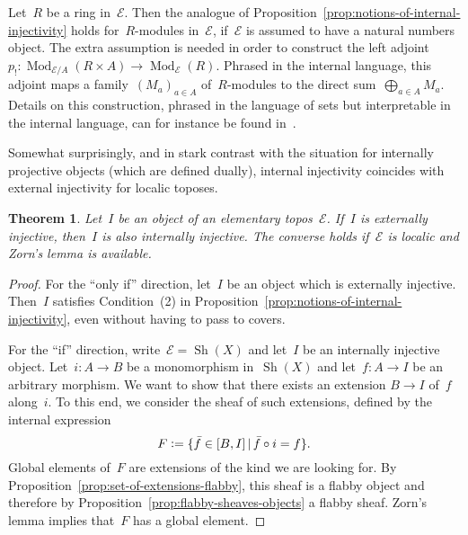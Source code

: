 \documentclass[oneside]{amsart}
\theoremstyle{definition}
\theoremstyle{plain}
\newtheorem{thm}[defn]{Theorem}
\theoremstyle{remark}
\newcommand{\E}{\mathcal{E}}
\newcommand{\defeq}{\vcentcolon=}
\DeclareMathOperator{\Mod}{Mod}
\DeclareMathOperator{\Sh}{Sh}
\renewcommand{\_}{\mathpunct{.}\,}
\begin{document}
Let~$R$ be a ring in~$\E$. Then the analogue of
Proposition~\ref{prop:notions-of-internal-injectivity} holds for~$R$-modules
in~$\E$, if~$\E$ is assumed to have a natural numbers object. The extra
assumption is needed in order to construct the left adjoint~$p_! :
\Mod_{\E/A}(R \times A) \to \Mod_\E(R)$. Phrased in the internal language, this
adjoint maps a family~$(M_a)_{a \in A}$ of~$R$-modules to the direct
sum~$\bigoplus_{a \in A} M_a$. Details on this construction, phrased in the
language of sets but interpretable in the internal language, can for instance
be found in~\cite[page~54]{mines-richman-ruitenburg:constructive-algebra}.

Somewhat surprisingly, and in stark contrast with the situation for internally
projective objects (which are defined dually), internal injectivity coincides
with external injectivity for localic toposes.

\begin{thm}\label{thm:injectivity-external-internal}
Let~$I$ be an object of an elementary topos~$\E$. If~$I$ is externally
injective, then~$I$ is also internally injective. The converse holds if~$\E$ is
localic and Zorn's lemma is available.
\end{thm}

\begin{proof}For the ``only if'' direction, let~$I$ be an object
which is externally injective. Then~$I$ satisfies Condition~(2) in
Proposition~\ref{prop:notions-of-internal-injectivity}, even without having to
pass to covers.

For the ``if'' direction, write~$\E = \Sh(X)$ and let~$I$ be an internally
injective object. Let~$i : A \to B$ be a monomorphism in~$\Sh(X)$ and let~$f :
A \to I$ be an arbitrary morphism. We want to show that there exists an
extension $B \to I$ of~$f$ along~$i$. To this end, we consider the sheaf of
such extensions, defined by the internal expression
\[ F \defeq \{ \bar{f} \in [B,I] \,|\, \bar{f} \circ i = f \}. \]
Global elements of~$F$ are extensions of the kind we are looking for.
By Proposition~\ref{prop:set-of-extensions-flabby}, this sheaf is a flabby
object and therefore by Proposition~\ref{prop:flabby-sheaves-objects} a flabby
sheaf. Zorn's lemma implies that~$F$ has a global element.
\end{proof}
\end{document}

